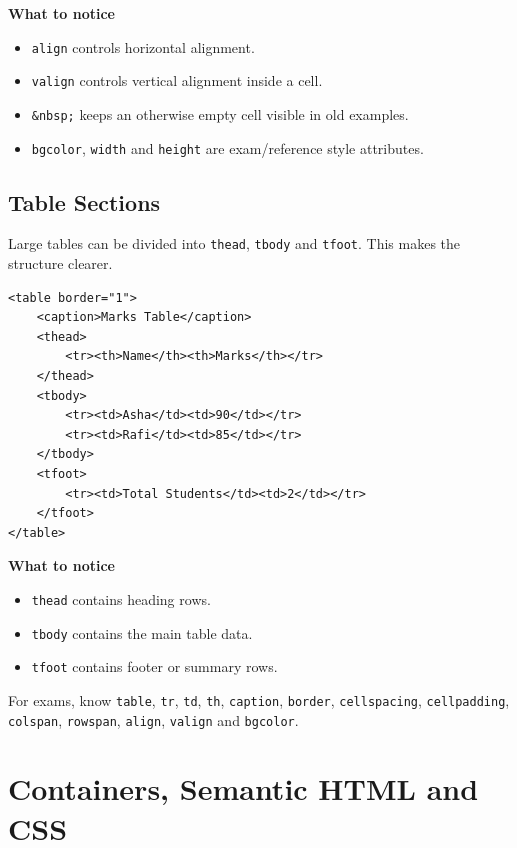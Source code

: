 \textbf{What to notice}
\begin{itemize}
    \item \texttt{align} controls horizontal alignment.
    \item \texttt{valign} controls vertical alignment inside a cell.
    \item \texttt{\&nbsp;} keeps an otherwise empty cell visible in old examples.
    \item \texttt{bgcolor}, \texttt{width} and \texttt{height} are exam/reference style attributes.
\end{itemize}

\subsection{Table Sections}
Large tables can be divided into \texttt{thead}, \texttt{tbody} and \texttt{tfoot}. This makes the structure clearer.

\begin{lstlisting}[style=htmlide, caption={Table Head, Body and Foot}]
<table border="1">
    <caption>Marks Table</caption>
    <thead>
        <tr><th>Name</th><th>Marks</th></tr>
    </thead>
    <tbody>
        <tr><td>Asha</td><td>90</td></tr>
        <tr><td>Rafi</td><td>85</td></tr>
    </tbody>
    <tfoot>
        <tr><td>Total Students</td><td>2</td></tr>
    </tfoot>
</table>
\end{lstlisting}

\textbf{What to notice}
\begin{itemize}
    \item \texttt{thead} contains heading rows.
    \item \texttt{tbody} contains the main table data.
    \item \texttt{tfoot} contains footer or summary rows.
\end{itemize}

\begin{summarybox}
For exams, know \texttt{table}, \texttt{tr}, \texttt{td}, \texttt{th}, \texttt{caption}, \texttt{border}, \texttt{cellspacing}, \texttt{cellpadding}, \texttt{colspan}, \texttt{rowspan}, \texttt{align}, \texttt{valign} and \texttt{bgcolor}.
\end{summarybox}

\section{Containers, Semantic HTML and CSS}

